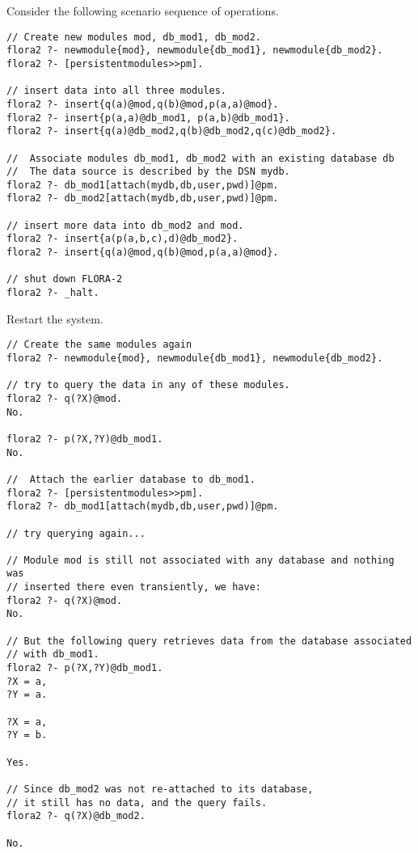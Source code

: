 Consider the following scenario sequence of operations.

\begin{verbatim}
// Create new modules mod, db_mod1, db_mod2.
flora2 ?- newmodule{mod}, newmodule{db_mod1}, newmodule{db_mod2}.
flora2 ?- [persistentmodules>>pm].

// insert data into all three modules.
flora2 ?- insert{q(a)@mod,q(b)@mod,p(a,a)@mod}.
flora2 ?- insert{p(a,a)@db_mod1, p(a,b)@db_mod1}.
flora2 ?- insert{q(a)@db_mod2,q(b)@db_mod2,q(c)@db_mod2}.

//  Associate modules db_mod1, db_mod2 with an existing database db
//  The data source is described by the DSN mydb.
flora2 ?- db_mod1[attach(mydb,db,user,pwd)]@pm.
flora2 ?- db_mod2[attach(mydb,db,user,pwd)]@pm.

// insert more data into db_mod2 and mod.
flora2 ?- insert{a(p(a,b,c),d)@db_mod2}.
flora2 ?- insert{q(a)@mod,q(b)@mod,p(a,a)@mod}.

// shut down FLORA-2
flora2 ?- _halt.
\end{verbatim}

\noindent
Restart the \FLORA system.

\begin{verbatim}
// Create the same modules again
flora2 ?- newmodule{mod}, newmodule{db_mod1}, newmodule{db_mod2}.

// try to query the data in any of these modules.
flora2 ?- q(?X)@mod.
No.

flora2 ?- p(?X,?Y)@db_mod1.
No.

//  Attach the earlier database to db_mod1.
flora2 ?- [persistentmodules>>pm].
flora2 ?- db_mod1[attach(mydb,db,user,pwd)]@pm.

// try querying again...

// Module mod is still not associated with any database and nothing was
// inserted there even transiently, we have:
flora2 ?- q(?X)@mod.
No.

// But the following query retrieves data from the database associated
// with db_mod1.
flora2 ?- p(?X,?Y)@db_mod1.
?X = a,
?Y = a.

?X = a,
?Y = b.

Yes.

// Since db_mod2 was not re-attached to its database,
// it still has no data, and the query fails.
flora2 ?- q(?X)@db_mod2.

No.
\end{verbatim}




